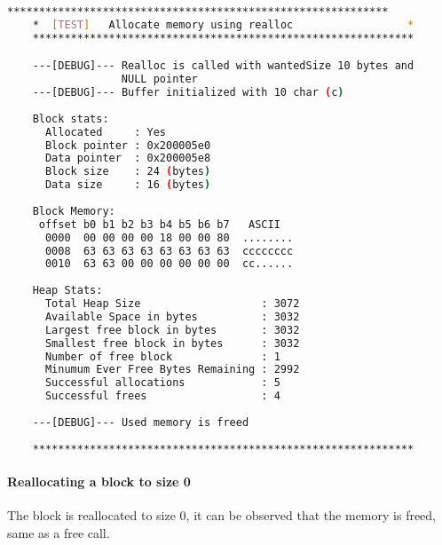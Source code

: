     \begin{outputbox}
    \begin{lstlisting}[language=bash]
    ************************************************************
    *  [TEST]   Allocate memory using realloc                  *
    ************************************************************

    ---[DEBUG]--- Realloc is called with wantedSize 10 bytes and
                  NULL pointer
    ---[DEBUG]--- Buffer initialized with 10 char (c)
    
    Block stats:
      Allocated     : Yes
      Block pointer : 0x200005e0
      Data pointer  : 0x200005e8
      Block size    : 24 (bytes)
      Data size     : 16 (bytes)
    
    Block Memory:
     offset b0 b1 b2 b3 b4 b5 b6 b7   ASCII
      0000  00 00 00 00 18 00 00 80  ........
      0008  63 63 63 63 63 63 63 63  cccccccc
      0010  63 63 00 00 00 00 00 00  cc......
    
    Heap Stats:
      Total Heap Size                   : 3072
      Available Space in bytes          : 3032
      Largest free block in bytes       : 3032
      Smallest free block in bytes      : 3032
      Number of free block              : 1
      Minumum Ever Free Bytes Remaining : 2992
      Successful allocations            : 5
      Successful frees                  : 4
    
    ---[DEBUG]--- Used memory is freed
    
    ************************************************************
    \end{lstlisting}
    \end{outputbox}

    \paragraph{Reallocating a block to size 0}
    The block is reallocated to size 0, it can be observed that the memory is freed, same as a free call.


